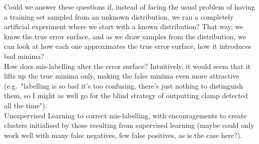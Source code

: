 \documentclass[a4paper,11pt]{article}
\begin{document}
Could we answer these questions if, instead of facing the usual problem of having a training set sampled from an unknown distribution, we ran a completely artificial experiment where we start with a known distribution? That way, we know the true error surface, and as we draw samples from the distribution, we can look at how each one approximates the true error surface, how it introduces bad minima? \\

How does mis-labelling alter the error surface? Intuitively, it would seem that it lifts up the true minima only, making the false minima even more attractive (e.g.\ "labelling is so bad it's too confusing, there's just nothing to distinguish them, so I might as well go for the blind strategy of outputting clamp detected all the time"). \\

Unsupervised Learning to correct mis-labelling, with encouragements to create clusters initialised by those resulting from supervised learning (maybe could only work well with many false negatives, few false positives, as is the case here?). \\ 
\end{document}
